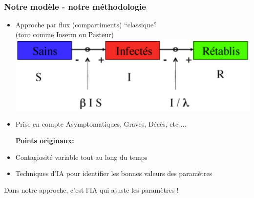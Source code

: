 \documentclass[a4paper]{cours-bdd}
\begin{document}
\begin{frame}[fragile]
  \frametitle{Notre modèle - notre méthodologie}
  \begin{itemize}
  \item Approche par flux (compartiments) ``classique'' \\ (tout comme Inserm ou Pasteur)
    \includegraphics[width=0.6\linewidth]{modeleSIR.png} \\
  \item Prise en compte Asymptomatiques, Graves, Décès, etc ...
    
    \bigskip    
    \textbf{Points originaux:}
  \item Contagiosité variable tout au long du temps
  \item Techniques d'IA pour identifier les bonnes valeurs des paramètres 
  \end{itemize}

  \begin{block}{}
    \begin{center}
  Dans notre approche, c'est l'IA qui ajuste les paramètres !
\end{center}
\end{block}

  
\end{frame}



\end{document}
